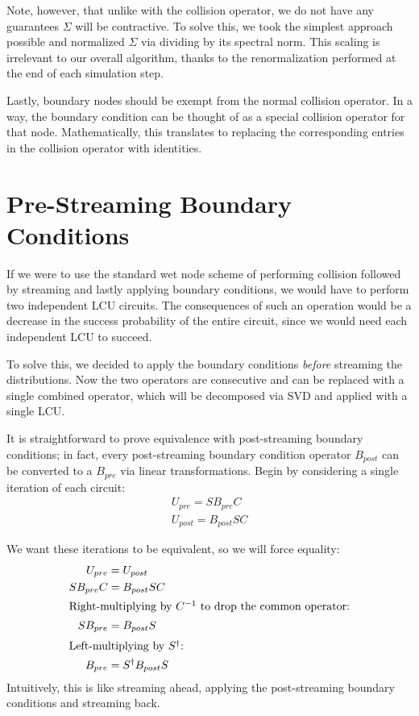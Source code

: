 Note, however, that unlike with the collision operator, we do not have any guarantees $\Sigma$ will be contractive.
To solve this, we took the simplest approach possible and normalized $\Sigma$ via dividing by its spectral norm.
This scaling is irrelevant to our overall algorithm, thanks to the renormalization performed at the end of each simulation step.

Lastly, boundary nodes should be exempt from the normal collision operator. In a way, the boundary condition can be thought of as a special collision operator for that node.
Mathematically, this translates to replacing the corresponding entries in the collision operator with identities.
\section{Pre-Streaming Boundary Conditions}
\label{sec:bc-optimization}

If we were to use the standard wet node scheme of performing collision followed by streaming and lastly applying boundary conditions, we would have to perform two independent LCU circuits.
The consequences of such an operation would be a decrease in the success probability of the entire circuit, since we would need each independent LCU to succeed.

To solve this, we decided to apply the boundary conditions \emph{before} streaming the distributions.
Now the two operators are consecutive and can be replaced with a single combined operator, which will be decomposed via SVD and applied with a single LCU.


It is straightforward to prove equivalence with post-streaming boundary conditions; in fact, every post-streaming boundary condition operator $B_{post}$ can be converted to a $B_{pre}$ via linear transformations.
Begin by considering a single iteration of each circuit:
\begin{align*}
    U_{pre} = S B_{pre} C \\
    U_{post} = B_{post} S C
\end{align*}

We want these iterations to be equivalent, so we will force equality:
\begin{align*}
    U_{pre} &= U_{post} \\
    S B_{pre} C &= B_{post} S C \\
\intertext{Right-multiplying by $C^{-1}$ to drop the common operator:}
    S B_{pre} &= B_{post} S \\
\intertext{Left-multiplying by $S^{\dagger}$:}
    B_{pre} &= S^{\dagger} B_{post} S
\end{align*}
Intuitively, this is like streaming ahead, applying the post-streaming boundary conditions and streaming back.

